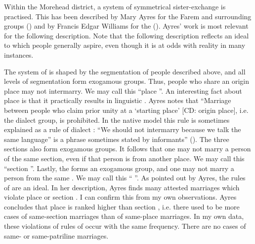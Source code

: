 Within the Morehead district, a system of symmetrical sister-exchange is practised. This has been described by Mary Ayres for the Farem and surrounding groups (\citeyear{Ayres:ws}) and by Francis Edgar Williams for the  (\citeyear{Williams:1936transfly}). Ayres' work is most relevant for the following description. Note that the following description reflects an ideal to which people generally aspire, even though it is at odds with reality in many instances.

The system of  is shaped by the segmentation of people described above, and all levels of segmentation form exogamous groups. Thus, people who share an origin place may not intermarry. We may call this ``place ''. An interesting fact about place  is that it practically results in linguistic . Ayres notes that ``Marriage between people who claim prior unity at a `starting place' [CD: origin place], i.e. the dialect group, is prohibited. In the native model this rule is sometimes explained as a rule of dialect : ``We should not intermarry because we talk the same language'' is a phrase sometimes stated by informants'' (\citeyear[186]{Ayres:ws}). The three sections also form exogamous groups. It follows that one may not marry a person of the same section, even if that person is from another place. We may call this ``section ''. Lastly, the  forms an exogamous group, and one may not marry a person from the same . We may call this `` ''. As pointed out by Ayres, the rules of  are an ideal. In her description, Ayres finds many attested marriages which violate place or section . I can confirm this from my own observations. Ayres concludes that place  is ranked higher than section , i.e. there used to be more cases of same-section marriages than of same-place marriages. In my own data, these violations of rules of  occur with the same frequency. There are no cases of same- or same-patriline marriages.

